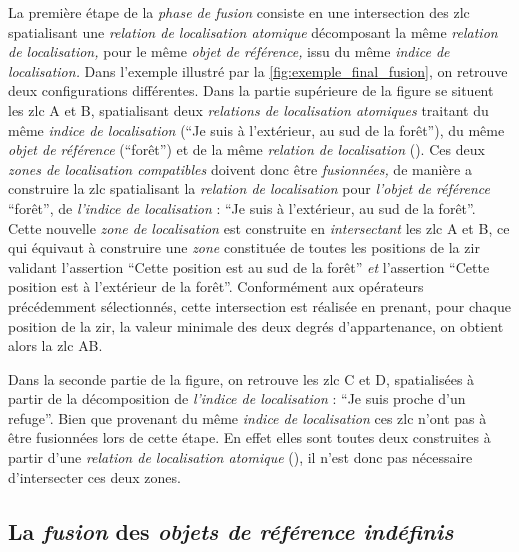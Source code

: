 La première étape de la \emph{phase de fusion} consiste en une
intersection des \ac{zlc} spatialisant une \emph{relation de
  localisation atomique} décomposant la même \emph{relation de
  localisation,} pour le même \emph{objet de référence,} issu du même
\emph{indice de localisation.} Dans l'exemple illustré par la
\autoref{fig:exemple_final_fusion}, on retrouve deux configurations
différentes. Dans la partie supérieure de la figure se situent les
\ac{zlc} \textcolor{RdBu-9-1}{\textsf{A}} et
\textcolor{RdBu-9-2}{\textsf{B}}, spatialisant deux \emph{relations de
  localisation atomiques} traitant du même \emph{indice de
  localisation} (\enquote{Je suis à l'extérieur, au sud de la forêt}),
du même \emph{objet de référence} (\enquote{forêt}) et de la même
\emph{relation de localisation}
(). Ces deux \emph{zones de
  localisation compatibles} doivent donc être \emph{fusionnées,} de
manière a construire la \ac{zlc} spatialisant la \emph{relation de
  localisation}  pour
\emph{l'objet de référence} \enquote{forêt}, de \emph{l'indice de
  localisation} : \enquote{Je suis à l'extérieur, au sud de la
  forêt}. Cette nouvelle \emph{zone de localisation} est construite en
\emph{intersectant} les \ac{zlc} \textcolor{RdBu-9-1}{\textsf{A}} et
\textcolor{RdBu-9-2}{\textsf{B}}, ce qui équivaut à construire une
\emph{zone} constituée de toutes les positions de la \ac{zir} validant
l'assertion \enquote{Cette position est au sud de la forêt} \emph{et}
l'assertion \enquote{Cette position est à l'extérieur de la
  forêt}. Conformément aux opérateurs précédemment sélectionnés, cette
intersection est réalisée en prenant, pour chaque position de la
\ac{zir}, la valeur minimale des deux degrés d'appartenance, on
obtient alors la \ac{zlc} \textcolor{RdBu-9-1}{\textsf{AB}}.

Dans la seconde partie de la figure, on retrouve les \ac{zlc}
\textcolor{RdBu-9-8}{\textsf{C}} et \textcolor{RdBu-9-9}{\textsf{D}},
spatialisées à partir de la décomposition de \emph{l'indice de
  localisation} : \enquote{Je suis proche d'un refuge}. Bien que
provenant du même \emph{indice de localisation} ces \ac{zlc} n'ont pas
à être fusionnées lors de cette étape. En effet elles sont toutes deux
construites à partir d'une \emph{relation de localisation atomique}
(), il n'est donc pas nécessaire d'intersecter
ces deux zones.

\subsection{La \emph{fusion} des \emph{objets de référence indéfinis}}


